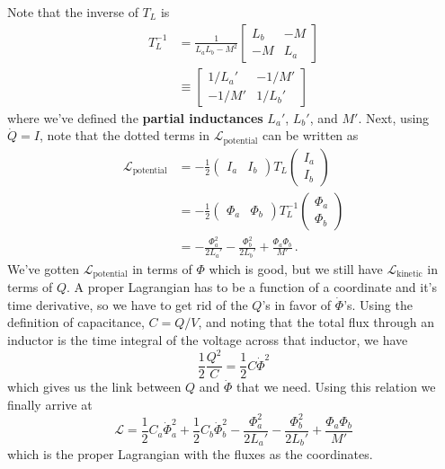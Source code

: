 Note that the inverse of $T_L$ is
\begin{align}
  T_L^{-1}
  &= \frac{1}{L_a L_b - M^2}
  \left[ \begin{array}{cc}
    L_b & -M \\ -M & L_a
  \end{array} \right] \nonumber \\
  &\equiv \left[ \begin{array}{cc}
    1/L_a' & -1/M' \\ -1/M' & 1/L_b'
  \end{array} \right]
\end{align}
where we've defined the \textbf{partial inductances} $L_a'$, $L_b'$, and $M'$.
Next, using $\dot{Q}=I$, note that the dotted terms in $\mathcal{L}_\text{potential}$ can be written as
\begin{align*}
  \mathcal{L}_\text{potential}
  &= -\frac{1}{2}
    \begin{pmatrix} I_a & I_b \end{pmatrix} T_L \begin{pmatrix} I_a \\ I_b \end{pmatrix} \\
  &= -\frac{1}{2}
    \begin{pmatrix} \Phi_a & \Phi_b \end{pmatrix}
    T_L^{-1}
    \begin{pmatrix} \Phi_a \\ \Phi_b \end{pmatrix} \\
  &= - \frac{\Phi_a^2}{2 L_a'} - \frac{\Phi_b^2}{2 L_b'} + \frac{\Phi_a \Phi_b}{M'}
  \, .
\end{align*}
We've gotten $\mathcal{L}_\text{potential}$ in terms of $\Phi$ which is good, but we still have $\mathcal{L}_\text{kinetic}$ in terms of $Q$.
A proper Lagrangian has to be a function of a coordinate and it's time derivative, so we have to get rid of the $Q$'s in favor of $\dot \Phi$'s.
Using the definition of capacitance, $C = Q/V$, and noting that the total flux through an inductor is the time integral of the voltage across that inductor, we have
\begin{equation*}
  \frac{1}{2}\frac{Q^2}{C} = \frac{1}{2}C \dot{\Phi}^2
\end{equation*}
which gives us the link between $Q$ and $\dot \Phi$ that we need.
Using this relation we finally arrive at
\begin{equation}
  \mathcal{L} =
  \frac{1}{2}C_a \dot{\Phi}_a^2 + \frac{1}{2}C_b \dot{\Phi}_b^2
  - \frac{\Phi_a^2}{2L_a'} - \frac{\Phi_b^2}{2L_b'}
  + \frac{\Phi_a \Phi_b}{M'}
\end{equation}
which is the proper Lagrangian with the fluxes as the coordinates.

